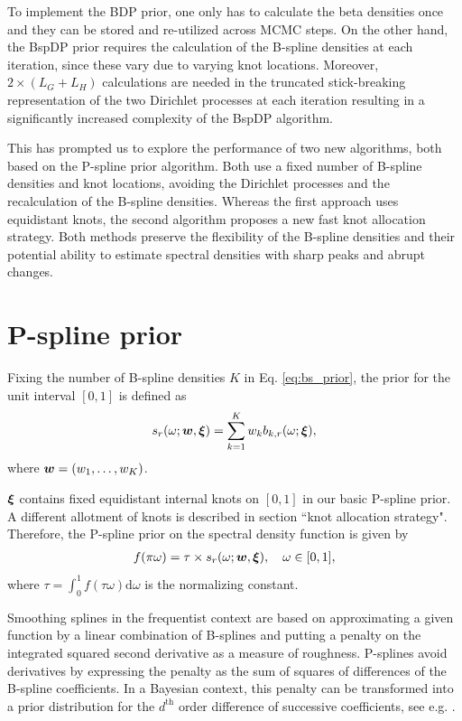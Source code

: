 \documentclass[twocolumn,final]{svjour3}
\newcommand{\bm}[1]{\mbox{\boldmath $#1$}}
\begin{document}
To implement the BDP prior, one only has to  calculate the beta densities once and they can be stored and re-utilized across MCMC steps.  On the other hand, the BspDP prior requires the calculation of the B-spline densities at each iteration, since these vary due to varying knot locations.  Moreover,  $2\!\times\!(L_G + L_H)$ calculations are needed in the truncated stick-breaking representation of the two Dirichlet processes  at each iteration %
resulting in a significantly increased complexity of  the  BspDP algorithm.


This has prompted us to explore the performance of two new algorithms, both based on the P-spline prior algorithm. Both use a fixed number of B-spline densities and knot locations, avoiding the Dirichlet processes and the recalculation of the B-spline densities. Whereas the first approach uses  equidistant knots, the second algorithm  proposes a new fast knot allocation strategy. Both methods preserve the flexibility of the B-spline densities and their potential ability to estimate spectral densities with sharp peaks and abrupt changes.


\section{P-spline prior}

Fixing the number of B-spline densities $K$ in Eq. \eqref{eq:bs_prior}, the prior for the unit interval $[0,1]$ is defined as
\begin{align*}
s_r(\omega;\bm{w}, \bm{\xi}) = \sum_{k=1}^{K} w_{k} b_{k,r}(\omega;\bm{\xi}),	
\end{align*}
where $\bm{w} = (w_1,\dots,w_K)$.

$\bm{\xi}$ contains fixed equidistant internal knots on $[0,1]$ in our basic P-spline prior. A different  allotment of knots is described in  section ``knot allocation strategy".
Therefore, the P-spline prior on the spectral density function is given by
\begin{align*}
f(\pi \omega) = \tau \times s_r(\omega;\bm{w}, \bm{\xi}), \quad \omega \in [0,1],
\end{align*}
where $\tau = \int_{0}^{1}f(\tau \omega)\text{d}\omega$ is the normalizing constant.

Smoothing splines in the frequentist context are based on approximating a given function by a linear combination of B-splines and
putting a penalty on the integrated squared second derivative  as a measure of roughness. P-splines avoid derivatives by expressing the penalty as the sum of squares of differences of the B-spline coefficients.
In a Bayesian context, this penalty can be transformed into a prior distribution for the $d^{\text{th}}$ order difference of successive coefficients, see e.g. \cite{Lang:2004}.
\end{document}
